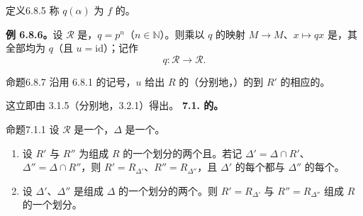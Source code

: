 \begin{SGAresult}{定义}{6.8.5}
称 $q(\alpha)$ 为 $f$ 的。
\end{SGAresult}
\textbf{例 6.8.6。}设 $\mathscr R$ 是，$q=p^n$（$n\in\mathbb N$）。则乘以 $q$ 的映射 $M\to M$、$x\mapsto qx$ 是，其全部均为 $q$（且 $u=\mathrm{id}$）；记作
\[q:\mathscr R\longrightarrow\mathscr R.\]
\begin{SGAresult}{命题}{6.8.7}
沿用 6.8.1 的记号，$u$ 给出 $R$ 的（分别地，）的到 $R'$ 的相应的。
\end{SGAresult}
这立即由 3.1.5（分别地，3.2.1）得出。
\textbf{7.1. 的。}
\begin{SGAresult}{命题}{7.1.1}
设 $\mathscr R$ 是一个，$\Delta$ 是一个。
\begin{enumerate}
\item[(i)] 设 $R'$ 与 $R''$ 为组成 $R$ 的一个划分的两个且。若记 $\Delta'=\Delta\cap R'$、$\Delta''=\Delta\cap R''$，则 $R'=R_{\Delta'}$、$R''=R_{\Delta''}$，且 $\Delta'$ 的每个都与 $\Delta''$ 的每个。
\item[(ii)] 设 $\Delta'$、$\Delta''$ 是组成 $\Delta$ 的一个划分的两个。则 $R'=R_{\Delta'}$ 与 $R''=R_{\Delta''}$ 组成 $R$ 的一个划分。
\end{enumerate}
\end{SGAresult}
